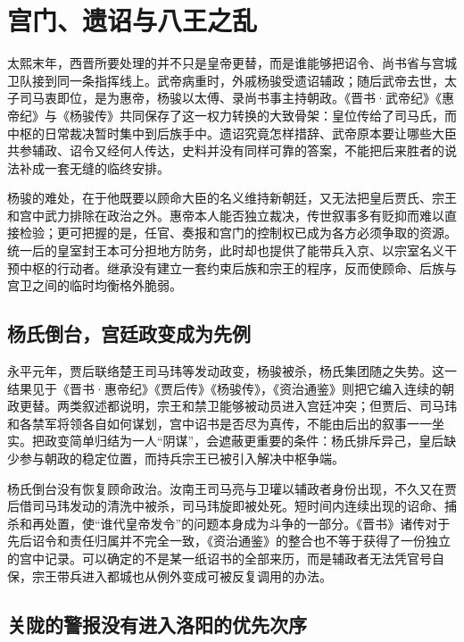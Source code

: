 \section{宫门、遗诏与八王之乱}
\label{sec:western-jin-court-politics-eight-princes}

太熙末年，西晋所要处理的并不只是皇帝更替，而是谁能够把诏令、尚书省与宫城卫队接到同一条指挥线上。武帝病重时，外戚杨骏受遗诏辅政；随后武帝去世，太子司马衷即位，是为惠帝，杨骏以太傅、录尚书事主持朝政。《晋书·武帝纪》《惠帝纪》与《杨骏传》共同保存了这一权力转换的大致骨架：皇位传给了司马氏，而中枢的日常裁决暂时集中到后族手中。遗诏究竟怎样措辞、武帝原本要让哪些大臣共参辅政、诏令又经何人传达，史料并没有同样可靠的答案，不能把后来胜者的说法补成一套无缝的临终安排。

杨骏的难处，在于他既要以顾命大臣的名义维持新朝廷，又无法把皇后贾氏、宗王和宫中武力排除在政治之外。惠帝本人能否独立裁决，传世叙事多有贬抑而难以直接检验；更可把握的是，任官、奏报和宫门的控制权已成为各方必须争取的资源。统一后的皇室封王本可分担地方防务，此时却也提供了能带兵入京、以宗室名义干预中枢的行动者。继承没有建立一套约束后族和宗王的程序，反而使顾命、后族与宫卫之间的临时均衡格外脆弱。

\subsection{杨氏倒台，宫廷政变成为先例}

永平元年，贾后联络楚王司马玮等发动政变，杨骏被杀，杨氏集团随之失势。这一结果见于《晋书·惠帝纪》《贾后传》《杨骏传》，《资治通鉴》则把它编入连续的朝政更替。两类叙述都说明，宗王和禁卫能够被动员进入宫廷冲突；但贾后、司马玮和各禁军将领各自如何谋划，宫中诏书是否尽为真传，不能由后出的叙事一一坐实。把政变简单归结为一人“阴谋”，会遮蔽更重要的条件：杨氏排斥异己，皇后缺少参与朝政的稳定位置，而持兵宗王已被引入解决中枢争端。

杨氏倒台没有恢复顾命政治。汝南王司马亮与卫瓘以辅政者身份出现，不久又在贾后借司马玮发动的清洗中被杀，司马玮旋即被处死。短时间内连续出现的诏命、捕杀和再处置，使“谁代皇帝发令”的问题本身成为斗争的一部分。《晋书》诸传对于先后诏令和责任归属并不完全一致，《资治通鉴》的整合也不等于获得了一份独立的宫中记录。可以确定的不是某一纸诏书的全部来历，而是辅政者无法凭官号自保，宗王带兵进入都城也从例外变成可被反复调用的办法。

\subsection{关陇的警报没有进入洛阳的优先次序}

